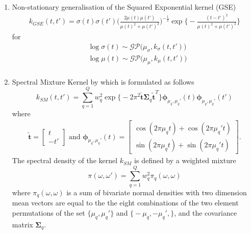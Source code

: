 \begin{enumerate}
\item Non-stationary generalisation of the Squared Exponential kernel (GSE)
\begin{align*}
k_{GSE}(t,t') = \sigma(t) \sigma(t') \bigg( \frac{2\mu(t) \mu(t')}{\mu(t)^2 +  \mu(t')^2}\bigg)^{-\frac{1}{2}} \exp \Big\{ - \frac{(t - t')^2}{\mu(t)^2 +  \mu(t')^2} \Big\} 
\end{align*}
for
\begin{align*}
& \log \sigma(t) \sim \mathcal{GP} \Big(\mu_\sigma, k_\sigma (t,t') \Big) \\
& \log \mu(t) \sim \mathcal{GP} \Big(\mu_\mu, k_\mu (t,t') \Big) \\
\end{align*}

\item Spectral Mixture Kernel by \citep{Remes2017}
which is formulated as follows
\begin{equation}
k_{SM}(t,t') = \sum_{q = 1}^Q w_q^2 \exp \Big\{ - 2 \pi^2 \tilde{\mathbf{t}}\bm{\Sigma}_q\tilde{\mathbf{t}}^T\Big\} \bm{\phi}_{\mu_q,\mu_q'} (t) \bm{\phi}_{\mu_q,\mu_q'} (t')
\end{equation}
where
\begin{align*}
\tilde{\mathbf{t}} = \begin{bmatrix}
t \\
- t'
\end{bmatrix} \text{ and } \bm{\phi}_{\mu_q,\mu_q'}(t) = \begin{bmatrix}
\cos (2 \pi \mu_{q} t) + \cos (2 \pi \mu_{q}' t)\\
\sin (2 \pi \mu_{q} t) + \sin (2 \pi \mu_{q}' t)
\end{bmatrix}.
\end{align*}
The spectral density of the kernel $k_{SM}$ is defined by a weighted mixture 
\begin{equation}
\pi(\omega,\omega') = \sum_{q = 1}^Q w_q^2 \pi_q(\omega,\omega)
\end{equation} 
where $\pi_q(\omega,\omega)$ is a sum of bivariate normal densities with two dimension mean vectors are equal to the the eight combinations of the two element permutations of the set $\big\{\mu_q,\mu_q'\big\}$ and $\big\{-\mu_q,-\mu_q',  \big\}$, and the covariance matrix $\bm{\Sigma}_q$.


\end{enumerate}
